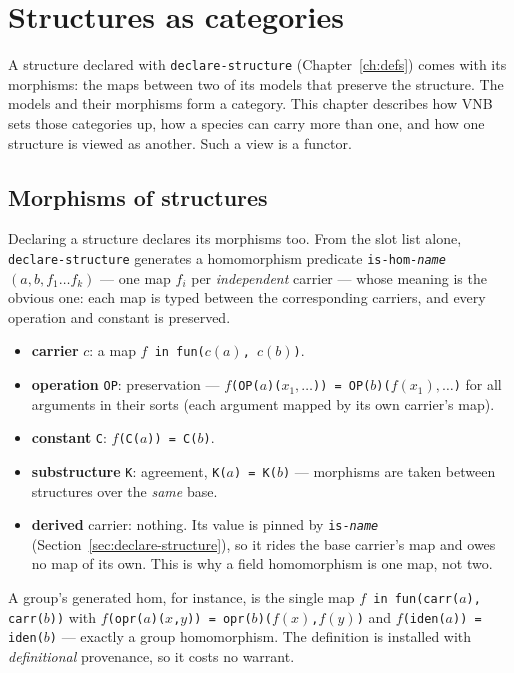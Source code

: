 \chapter{Structures as categories}
\label{ch:categories}

A structure declared with \texttt{declare-structure}
(Chapter~\ref{ch:defs}) comes with its morphisms: the maps between two
of its models that preserve the structure.  The models and their
morphisms form a category.  This chapter describes how VNB sets those
categories up, how a species can carry more than one, and how one
structure is viewed as another.  Such a view is a functor.

\section{Morphisms of structures}
\label{sec:morphisms}

Declaring a structure declares its morphisms too.  From the slot list alone,
\texttt{declare-structure} generates a homomorphism predicate
\texttt{is-hom-\textit{name}}$(a, b, f_1 \ldots f_k)$ --- one map $f_i$ per
\emph{independent} carrier --- whose meaning is the obvious one: each map is
typed between the corresponding carriers, and every operation and constant is
preserved.

\begin{itemize}
\item \textbf{carrier} $c$: a map \texttt{$f$ in fun($c(a)$, $c(b)$)}.
\item \textbf{operation} \texttt{OP}: preservation ---
  \texttt{$f$(OP($a$)($x_1,\ldots$)) = OP($b$)($f(x_1),\ldots$)} for all
  arguments in their sorts (each argument mapped by its own carrier's map).
\item \textbf{constant} \texttt{C}: \texttt{$f$(C($a$)) = C($b$)}.
\item \textbf{substructure} \texttt{K}: agreement, \texttt{K($a$) = K($b$)} ---
  morphisms are taken between structures over the \emph{same} base.
\item \textbf{derived} carrier: nothing.  Its value is pinned by
  \texttt{is-\textit{name}} (Section~\ref{sec:declare-structure}), so it rides
  the base carrier's map and owes no map of its own.  This is why a field
  homomorphism is one map, not two.
\end{itemize}

\noindent A group's generated hom, for instance, is the single map \texttt{$f$
in fun(carr($a$), carr($b$))} with \texttt{$f$(opr($a$)($x$,$y$)) =
opr($b$)($f(x)$,$f(y)$)} and \texttt{$f$(iden($a$)) = iden($b$)} --- exactly a
group homomorphism.  The definition is installed with \emph{definitional}
provenance, so it costs no warrant.

